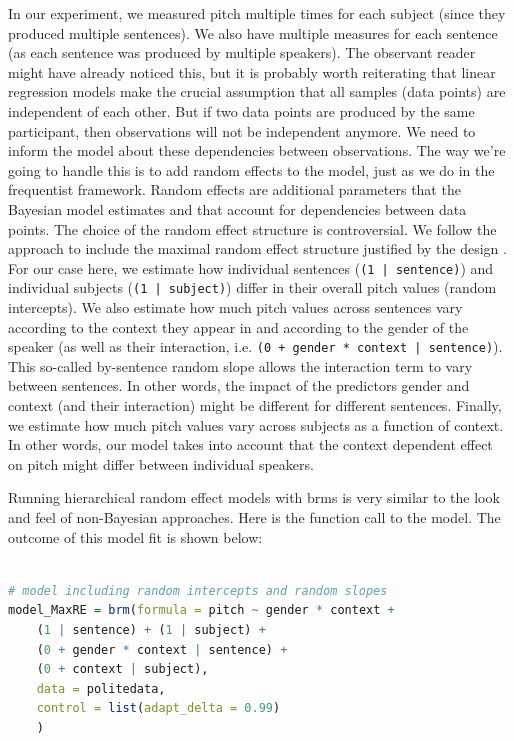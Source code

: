 \documentclass[nobib]{tufte-handout}
\begin{document}
In our experiment, we measured pitch multiple times for each subject (since they produced
multiple sentences). We also have multiple measures for each sentence (as each sentence was
produced by multiple speakers). The observant reader might have already noticed this, but it is probably worth reiterating that linear regression models make the crucial
assumption that all samples (data points) are independent of each other. But if two data points are produced by the same participant,
then observations will not be
independent anymore. We need to inform the model about these dependencies between observations. The way we’re going to handle this is to add random effects to the model, just as we do in the frequentist framework. Random effects are additional parameters that the Bayesian model estimates and that account for dependencies between data points. The choice of the random effect structure is controversial. We follow the approach to include the maximal random effect structure justified by the design \citep{barr2013random} \citep[for a complementary view on random effect specifications, see][]{matuschek2017balancing}. For our case here, we estimate how  individual sentences (\texttt{(1 | sentence)})  and individual subjects  (\texttt{(1 | subject)})  differ in their overall pitch values (random intercepts). We also estimate how much pitch values across sentences vary according to the context they appear in and according to the gender of the speaker (as well as their interaction, i.e. \texttt{(0 + gender * context | sentence)}). This so-called by-sentence random slope allows the interaction term to vary between sentences. In other words, the impact of the predictors gender and context (and their interaction) might be different for different sentences. Finally, we estimate how much pitch values vary across subjects as a function of context. In other words, our model takes into account that the context dependent effect on pitch might differ between individual speakers.

Running hierarchical random effect models with \textrm{brms} is very similar to the look and feel of non-Bayesian approaches. Here is the function call to the model.
The outcome of this model fit is shown below:

\bigskip

\begin{minipage}[]{1\textwidth}
\begin{lstlisting}[language=R]

# model including random intercepts and random slopes 
model_MaxRE = brm(formula = pitch ~ gender * context +
	(1 | sentence) + (1 | subject) + 
	(0 + gender * context | sentence) +
	(0 + context | subject),
	data = politedata,
	control = list(adapt_delta = 0.99)
	)
\end{lstlisting}
\end{minipage}
\end{document}
